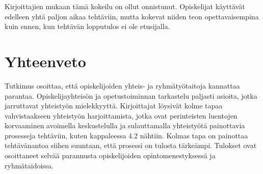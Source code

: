 \documentclass[finnish]{article}
\begin{document}
Kirjoittajien mukaan tämä kokeilu on ollut onnistunut. Opiskelijat käyttävät edelleen yhtä paljon aikaa tehtäviin, mutta kokevat niiden teon opettavaisempina kuin ennen, kun tehtävän lopputulos ei ole etusijalla.

\section{Yhteenveto}

Tutkimus osoittaa, että opiskelijoiden yhteis- ja ryhmätyötaitoja kannattaa parantaa. Opiskelijayhteisön ja opetustoiminnan tarkastelu paljasti asioita, jotka jarruttavat yhteistyön mielekkyyttä. Kirjoittajat löysivät kolme tapaa vahvistaakseen yhteistyön harjoittamista, jotka ovat perinteisten luentojen korvaaminen avoimella keskustelulla ja sulauttamalla yhteistyötä painottavia prosesseja tehtäviin, kuten kappaleessa 4.2 nähtiin. Kolmas tapa on painottaa tehtävänantoa siihen suuntaan, että prosessi on tulosta tärkeämpi. Tulokset ovat osoittaneet selvää parannusta opiskelijoiden opintomenestyksessä ja ryhmätaidoissa.



\end{document}
